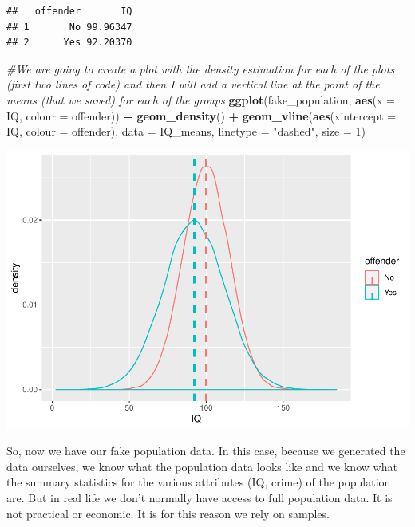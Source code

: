 \documentclass[]{book}
\newenvironment{Shaded}{\begin{snugshade}}{\end{snugshade}}
\newcommand{\CommentTok}[1]{\textcolor[rgb]{0.56,0.35,0.01}{\textit{#1}}}
\newcommand{\DataTypeTok}[1]{\textcolor[rgb]{0.13,0.29,0.53}{#1}}
\newcommand{\DecValTok}[1]{\textcolor[rgb]{0.00,0.00,0.81}{#1}}
\newcommand{\KeywordTok}[1]{\textcolor[rgb]{0.13,0.29,0.53}{\textbf{#1}}}
\newcommand{\NormalTok}[1]{#1}
\newcommand{\OperatorTok}[1]{\textcolor[rgb]{0.81,0.36,0.00}{\textbf{#1}}}
\newcommand{\StringTok}[1]{\textcolor[rgb]{0.31,0.60,0.02}{#1}}
\theoremstyle{definition}
\theoremstyle{definition}
\theoremstyle{definition}
\theoremstyle{remark}
\begin{document}
\begin{verbatim}
##   offender       IQ
## 1       No 99.96347
## 2      Yes 92.20370
\end{verbatim}

\begin{Shaded}
\begin{Highlighting}[]
\CommentTok{#We are going to create a plot with the density estimation for each of the plots (first two lines of code) and then I will add a vertical line at the point of the means (that we saved) for each of the groups}
\KeywordTok{ggplot}\NormalTok{(fake_population, }\KeywordTok{aes}\NormalTok{(}\DataTypeTok{x =}\NormalTok{ IQ, }\DataTypeTok{colour =}\NormalTok{ offender)) }\OperatorTok{+}\StringTok{ }
\StringTok{  }\KeywordTok{geom_density}\NormalTok{() }\OperatorTok{+}
\StringTok{  }\KeywordTok{geom_vline}\NormalTok{(}\KeywordTok{aes}\NormalTok{(}\DataTypeTok{xintercept =}\NormalTok{ IQ, }\DataTypeTok{colour =}\NormalTok{ offender), }\DataTypeTok{data =}\NormalTok{ IQ_means,}
             \DataTypeTok{linetype =} \StringTok{"dashed"}\NormalTok{, }\DataTypeTok{size =} \DecValTok{1}\NormalTok{)}
\end{Highlighting}
\end{Shaded}

\includegraphics{05-inference_files/figure-latex/unnamed-chunk-8-1.pdf}

So, now we have our fake population data. In this case, because we
generated the data ourselves, we know what the population data looks
like and we know what the summary statistics for the various attributes
(IQ, crime) of the population are. But in real life we don't normally
have access to full population data. It is not practical or economic. It
is for this reason we rely on samples.
\end{document}
